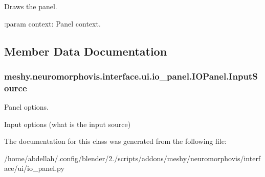 \begin{DoxyVerb}Draws the panel.

:param context: Panel context.
\end{DoxyVerb}
 

\subsection{Member Data Documentation}
\subsubsection[{\texorpdfstring{Input\+Source}{InputSource}}]{\setlength{\rightskip}{0pt plus 5cm}meshy.\+neuromorphovis.\+interface.\+ui.\+io\+\_\+panel.\+I\+O\+Panel.\+Input\+Source\hspace{0.3cm}{\ttfamily [static]}}\hypertarget{classmeshy_1_1neuromorphovis_1_1interface_1_1ui_1_1io__panel_1_1IOPanel_aa29d4258376490f277499fabc2a864dc}{}\label{classmeshy_1_1neuromorphovis_1_1interface_1_1ui_1_1io__panel_1_1IOPanel_aa29d4258376490f277499fabc2a864dc}


Panel options. 

Input options (what is the input source) 

The documentation for this class was generated from the following file\+:\begin{DoxyCompactItemize}
\item 
/home/abdellah/.\+config/blender/2./scripts/addons/meshy/neuromorphovis/interface/ui/io\+\_\+panel.\+py\end{DoxyCompactItemize}
